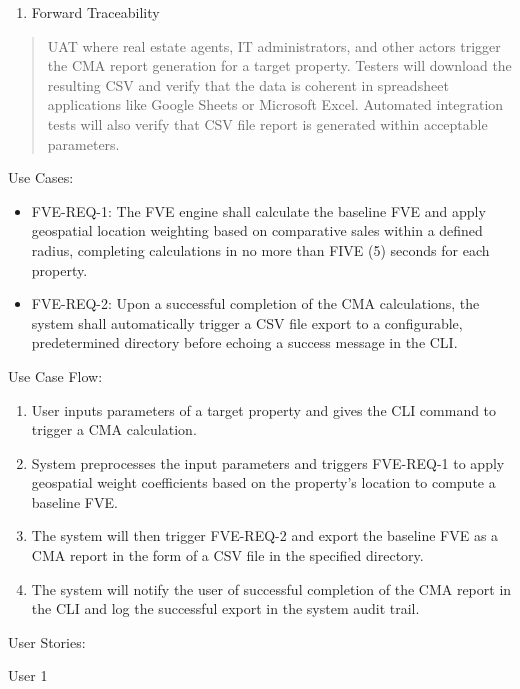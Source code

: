 \documentclass[
]{article}
\begin{document}
\begin{enumerate}
\def\labelenumi{\alph{enumi}.}
\item
  Forward Traceability
\end{enumerate}

\begin{quote}
UAT where real estate agents, IT administrators, and other actors
trigger the CMA report generation for a target property. Testers will
download the resulting CSV and verify that the data is coherent in
spreadsheet applications like Google Sheets or Microsoft Excel.
Automated integration tests will also verify that CSV file report is
generated within acceptable parameters.
\end{quote}

Use Cases:

\begin{itemize}
\item
  FVE-REQ-1: The FVE engine shall calculate the baseline FVE and apply
  geospatial location weighting based on comparative sales within a
  defined radius, completing calculations in no more than FIVE (5)
  seconds for each property.
\item
  FVE-REQ-2: Upon a successful completion of the CMA calculations, the
  system shall automatically trigger a CSV file export to a
  configurable, predetermined directory before echoing a success message
  in the CLI.
\end{itemize}

Use Case Flow:

\begin{enumerate}
\def\labelenumi{\arabic{enumi}.}
\item
  User inputs parameters of a target property and gives the CLI command
  to trigger a CMA calculation.
\item
  System preprocesses the input parameters and triggers FVE-REQ-1 to
  apply geospatial weight coefficients based on the property's location
  to compute a baseline FVE.
\item
  The system will then trigger FVE-REQ-2 and export the baseline FVE as
  a CMA report in the form of a CSV file in the specified directory.
\item
  The system will notify the user of successful completion of the CMA
  report in the CLI and log the successful export in the system audit
  trail.
\end{enumerate}

User Stories:

User 1
\end{document}
